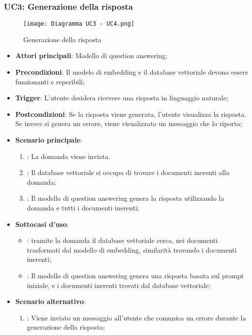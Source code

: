 \hypertarget{UC3}{}
\subsubsection{UC3: Generazione della risposta}

\begin{figure}[h]
    \centering
    \texttt{[image: Diagramma UC3 - UC4.png]}
    \caption{Generazione della risposta}
\end{figure}

\begin{itemize}
    \item \textbf{Attori principali}: Modello di question answering;
    \item \textbf{Precondizioni}: Il modelo di embedding e il database vettoriale devono essere funzionanti e reperibili;
    \item \textbf{Trigger}: L'utente desidera ricevere una risposta in linguaggio naturale;
    \item \textbf{Postcondizioni}: Se la risposta viene generata, l'utente visualizza la risposta. Se invece si genera un errore, viene visualizzato un messaggio che lo riporta;
    \item \textbf{Scenario principale}:
    \begin{enumerate}
        \item {}: La domanda viene inviata.
        \item {}: Il database vettoriale si occupa di trovare i documenti inerenti alla domanda;
        \item {}: Il modello di question answering genera la risposta utilizzando la domanda e tutti i documenti inerenti;
    \end{enumerate}
    \item \textbf{Sottocasi d'uso}:
    \begin{itemize}
        \item {}: tramite la domanda il database vettoriale cerca, nei documenti trasformati dal modello di embedding, similarità trovando i documenti inerenti;
        \item {}: Il modello di question answering genera una risposta basata sul prompt iniziale, e i documenti inerenti trovati dal database vettoriale;
    \end{itemize}
    \item \textbf{Scenario alternativo}:
    \begin{enumerate}
        \item {}: Viene inviato un messaggio all'utente che comunica un errore durante la generazione della risposta;
    \end{enumerate}
\end{itemize}

